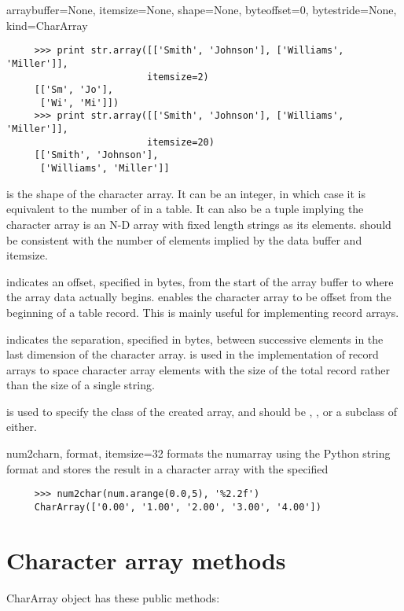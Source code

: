 \begin{funcdesc}{array}{buffer=None, itemsize=None, shape=None, byteoffset=0,
    bytestride=None, kind=CharArray}
\begin{verbatim}
     >>> print str.array([['Smith', 'Johnson'], ['Williams', 'Miller']], 
                         itemsize=2)
     [['Sm', 'Jo'],
      ['Wi', 'Mi']])
     >>> print str.array([['Smith', 'Johnson'], ['Williams', 'Miller']], 
                         itemsize=20)
     [['Smith', 'Johnson'],
      ['Williams', 'Miller']]
\end{verbatim}
   
    is the shape of the character array.  It can be an integer, in
   which case it is equivalent to the number of  in a table.  It can
   also be a tuple implying the character array is an N-D array with fixed
   length strings as its elements.  should be consistent with
   the number of elements implied by the data buffer and itemsize.

    indicates an offset, specified in bytes, from the start
   of the array buffer to where the array data actually begins.  
    enables the character array to be offset from the
   beginning of a table record.  This is mainly useful for implementing
   record arrays.

    indicates the separation, specified in bytes, between
   successive elements in the last dimension of the character array.
    is used in the implementation of record arrays to space
   character array elements with the size of the total record rather than the
   size of a single string.
   
    is used to specify the class of the created array, and should be
   , , or a subclass of either.
\end{funcdesc}
   
\begin{funcdesc}{num2char}{n, format, itemsize=32}
\label{func:str.num2char}
 formats the numarray  using the Python string format
 and stores the result in a character array with the specified
\begin{verbatim}
     >>> num2char(num.arange(0.0,5), '%2.2f')
     CharArray(['0.00', '1.00', '2.00', '3.00', '4.00'])
\end{verbatim}
\end{funcdesc}

\section{Character array methods}
\label{sec:recarray-methods}
CharArray object has these public methods:

